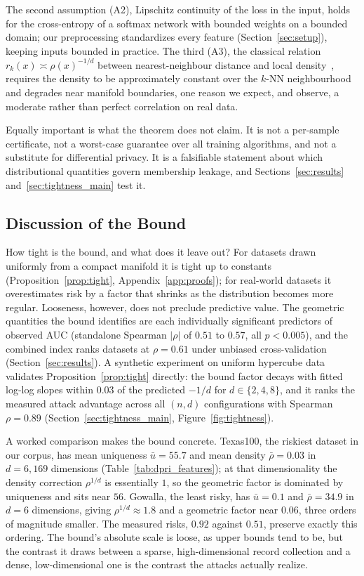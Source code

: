 The second assumption (A2), Lipschitz continuity of the loss in the
input, holds for the cross-entropy of a softmax network with bounded
weights on a bounded domain; our preprocessing standardizes every
feature (Section~\ref{sec:setup}), keeping inputs bounded in practice.
The third (A3), the classical relation $r_k(x) \asymp \rho(x)^{-1/d}$
between nearest-neighbour distance and local
density~\cite{biau2015lectures}, requires the density to be
approximately constant over the $k$-NN neighbourhood and degrades near
manifold boundaries, one reason we expect, and observe, a moderate
rather than perfect correlation on real data.

Equally important is what the theorem does not claim. It is not a
per-sample certificate, not a worst-case guarantee over all training
algorithms, and not a substitute for differential privacy. It is a
falsifiable statement about which distributional quantities govern
membership leakage, and Sections~\ref{sec:results}
and~\ref{sec:tightness_main} test it.

\subsection{Discussion of the Bound}

How tight is the bound, and what does it leave out? For datasets drawn
uniformly from a compact manifold it is tight up to constants
(Proposition~\ref{prop:tight}, Appendix~\ref{app:proofs}); for
real-world datasets it overestimates risk by a factor that shrinks as
the distribution becomes more regular. Looseness, however, does not
preclude predictive value. The geometric quantities the bound identifies
are each individually significant predictors of observed AUC (standalone
Spearman $|\rho|$ of $0.51$ to $0.57$, all $p<0.005$), and the combined
index ranks datasets at $\rho = 0.61$ under unbiased cross-validation
(Section~\ref{sec:results}). A synthetic experiment on uniform hypercube
data validates Proposition~\ref{prop:tight} directly: the bound factor
decays with fitted log-log slopes within $0.03$ of the predicted $-1/d$
for $d \in \{2,4,8\}$, and it ranks the measured attack advantage across
all $(n,d)$ configurations with Spearman $\rho = 0.89$
(Section~\ref{sec:tightness_main}, Figure~\ref{fig:tightness}).

A worked comparison makes the bound concrete. Texas100, the riskiest
dataset in our corpus, has mean uniqueness $\bar{u} = 55.7$ and mean
density $\bar{\rho} = 0.03$ in $d = 6{,}169$ dimensions
(Table~\ref{tab:dpri_features}); at that dimensionality the density
correction $\rho^{1/d}$ is essentially $1$, so the geometric factor is
dominated by uniqueness and sits near $56$. Gowalla, the least risky,
has $\bar{u} = 0.1$ and $\bar{\rho} = 34.9$ in $d = 6$ dimensions,
giving $\rho^{1/d} \approx 1.8$ and a geometric factor near $0.06$,
three orders of magnitude smaller. The measured risks, $0.92$ against
$0.51$, preserve exactly this ordering. The bound's absolute scale is
loose, as upper bounds tend to be, but the contrast it draws between a
sparse, high-dimensional record collection and a dense, low-dimensional
one is the contrast the attacks actually realize.

